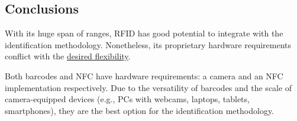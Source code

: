 \subsection{Conclusions} 

With its huge span of ranges, RFID has good potential to
integrate with the identification methodology.
Nonetheless, its proprietary hardware requirements conflict
with the \hyperref[ss:goal]{desired flexibility}.

Both barcodes and NFC have hardware requirements: a camera
and an NFC implementation respectively.
Due to the versatility of barcodes and the scale of
camera-equipped devices (e.g., PCs with webcams, laptops,
tablets, smartphones), they are the best option for the
identification methodology.
